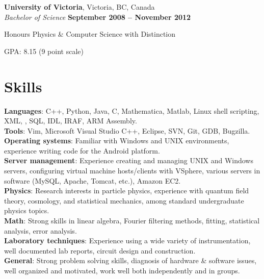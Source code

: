 \documentclass[margin,line]{resume}
\begin{document}
\begin{resume}
    \textbf{University of Victoria}, Victoria, BC, Canada \vspace{2mm}\\\vspace{1mm}%
    \textsl{Bachelor of Science} \hfill \textbf{ September 2008 -- November 2012}\vspace{-3mm}\\\vspace{-1mm}%
    \begin{list2}
        \item Honours Physics \& Computer Science with Distinction
        \item GPA: 8.15 (9 point scale)
    \end{list2}\vspace{2mm}

    \section{\mysidestyle Skills} 

    \textbf{Languages}: C++, Python, Java, C, Mathematica, Matlab, Linux shell scripting, XML, \LaTeXe, SQL, IDL, IRAF, ARM Assembly.\vspace{1mm}\\
    \textbf{Tools}: Vim, Microsoft Visual Studio C++, Eclipse, SVN, Git, GDB, Bugzilla.\vspace{1mm}\\
    \textbf{Operating systems}: Familiar with Windows and UNIX environments, experience writing code for the Android platform.\vspace{1mm}\\
    \textbf{Server management}: Experience creating and managing UNIX and Windows servers, configuring virtual machine hosts/clients with VSphere, various servers in software (MySQL, Apache, Tomcat, etc.), Amazon EC2.\vspace{1mm}\\
    \textbf{Physics}: Research interests in particle physics, experience with quantum field theory, cosmology, and statistical mechanics, among standard undergraduate physics topics.\vspace{1mm}\\
    \textbf{Math}: Strong skills in linear algebra, Fourier filtering methods, fitting, statistical analysis, error analysis.\vspace{1mm}\\
    \textbf{Laboratory techniques}: Experience using a wide variety of instrumentation, well documented lab reports, circuit design and construction.\vspace{1mm}\\
    \textbf{General}: Strong problem solving skills, diagnosis of hardware \& software issues, well organized and motivated, work well both independently and in groups.\vspace{1mm}\\


\end{resume}
\end{document}
